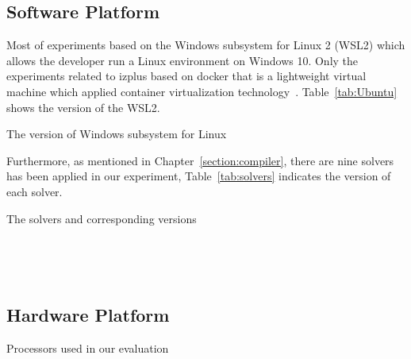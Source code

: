 \subsection{Software Platform}
\label{sec:softplat}
Most of experiments based on the Windows subsystem for Linux 2 (WSL2) which allows the developer run a Linux environment on Windows 10. Only the experiments related to izplus based on docker that is a lightweight virtual machine which applied container virtualization technology~\cite{r25}. Table~\ref{tab:Ubuntu} shows the version of the WSL2.
\begin{table}[htbp]
  \centering

  \caption{The version of Windows subsystem for Linux}
  
  \label{tab:Ubuntu}
  
\end{table}
Furthermore, as mentioned in Chapter~\ref{section:compiler}, there are nine solvers has been applied in our experiment, Table~\ref{tab:solvers} indicates the version of each solver.
\begin{table}[htbp]
  \centering

  \caption{The solvers and corresponding versions}
  
  \label{tab:solvers}
  	\begin{subtable}[b]{\textwidth}
  	\centering
  
    \end{subtable}\\
    	\begin{subtable}[b]{\textwidth}
  	\centering
  
  \end{subtable}\\
  \begin{subtable}[b]{\textwidth}
  \centering
  
  \end{subtable}
\end{table}
\subsection{Hardware Platform}
\label{sec:hardplat}

\begin{table}[htbp]
  \centering

  \caption{Processors used in our evaluation}
  
  \label{tab:machines}
  
\end{table}


